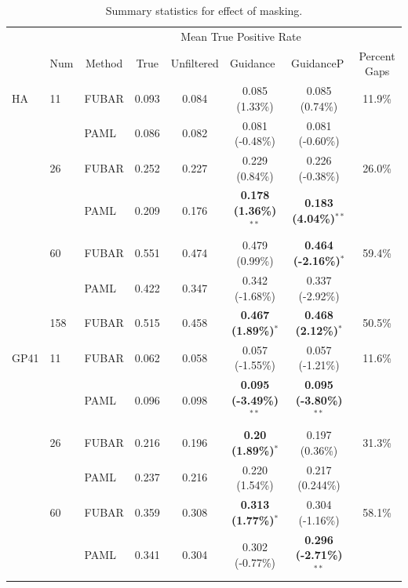 \documentclass[11pt]{article}
\begin{document}
\begin{table}[htbp]
\begin{adjustwidth}{-1.85cm}{}
\caption {\label{tab:summarystats} Summary statistics for effect of masking.}
\begin{tabular}{l l l c c c c c}
\hline\noalign{\smallskip}
& & & \multicolumn{4}{c}{Mean True Positive Rate} \\
\cline{4-7}\noalign{\smallskip}
\multicolumn{1}{c}{Profile} & \multicolumn{1}{c}{Num} & \multicolumn{1}{c}{Method} & \multicolumn{1}{c}{True} & \multicolumn{1}{c}{Unfiltered} & \multicolumn{1}{l}{Guidance} & \multicolumn{1}{l}{GuidanceP} & \multicolumn{1}{c}{Percent Gaps} \\
\noalign{\smallskip}\hline\noalign{\smallskip}
HA  &  11  &  FUBAR  &  0.093  &  0.084  & 0.085 (1.33\%)  &  0.085 (0.74\%) & 11.9\% \\
  &    &  PAML  &  0.086  &  0.082  & 0.081 (-0.48\%)  &  0.081 (-0.60\%) &\\

 & 26 & FUBAR & 0.252 & 0.227 & 0.229 (0.84\%) & 0.226 (-0.38\%) & 26.0\%\\
 &   & PAML & 0.209 & 0.176 & \textbf{0.178 (1.36\%)$^{\ast\ast}$} & \textbf{0.183 (4.04\%)$^{\ast\ast}$} &\\

 & 60 & FUBAR & 0.551 & 0.474 & 0.479 (0.99\%) & \textbf{0.464 (-2.16\%)$^{\ast}$} & 59.4\%\\
 &  & PAML & 0.422 & 0.347 & 0.342 (-1.68\%) & 0.337 (-2.92\%) &\\

 & 158 & FUBAR & 0.515 & 0.458 & \textbf{0.467 (1.89\%)$^{\ast}$} & \textbf{0.468 (2.12\%)$^{\ast}$} & 50.5\%\\
\noalign{\smallskip}\hline\noalign{\smallskip}
GP41  &  11 &  FUBAR  &  0.062  &  0.058  &  0.057 (-1.55\%)  &  0.057 (-1.21\%) & 11.6\%\\
  &    &  PAML  &  0.096  &  0.098  & \textbf{0.095 (-3.49\%)$^{\ast\ast}$}  &  \textbf{0.095 (-3.80\%)$^{\ast\ast}$} &\\

 & 26 & FUBAR & 0.216 & 0.196 & \textbf{0.20 (1.89\%)$^{\ast}$} & 0.197 (0.36\%) & 31.3\%\\
 & & PAML & 0.237 & 0.216 & 0.220 (1.54\%) & 0.217 (0.244\%) &\\

 & 60 & FUBAR & 0.359 & 0.308 & \textbf{0.313 (1.77\%)$^{\ast}$} & 0.304 (-1.16\%) & 58.1\%\\
 & & PAML & 0.341 & 0.304 &0.302 (-0.77\%) & \textbf{0.296 (-2.71\%)$^{\ast\ast}$} & \\


\end{tabular}
\end{adjustwidth}
\end{table}
\end{document}
